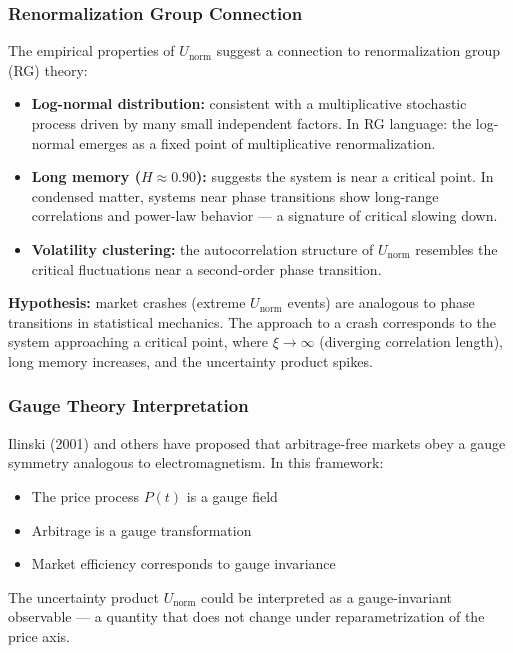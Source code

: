 \documentclass[11pt]{article}
\begin{document}
\subsubsection{Renormalization Group Connection}

The empirical properties of $U_\mathrm{norm}$ suggest a connection to renormalization group (RG) theory:

\begin{itemize}
    \item \textbf{Log-normal distribution:} consistent with a multiplicative stochastic process driven by many small independent factors. In RG language: the log-normal emerges as a fixed point of multiplicative renormalization.
    \item \textbf{Long memory ($H \approx 0.90$):} suggests the system is near a critical point. In condensed matter, systems near phase transitions show long-range correlations and power-law behavior --- a signature of critical slowing down.
    \item \textbf{Volatility clustering:} the autocorrelation structure of $U_\mathrm{norm}$ resembles the critical fluctuations near a second-order phase transition.
\end{itemize}

\textbf{Hypothesis:} market crashes (extreme $U_\mathrm{norm}$ events) are analogous to phase transitions in statistical mechanics. The approach to a crash corresponds to the system approaching a critical point, where $\xi \to \infty$ (diverging correlation length), long memory increases, and the uncertainty product spikes.

\subsubsection{Gauge Theory Interpretation}

Ilinski (2001) and others have proposed that arbitrage-free markets obey a gauge symmetry analogous to electromagnetism. In this framework:
\begin{itemize}
    \item The price process $P(t)$ is a gauge field
    \item Arbitrage is a gauge transformation
    \item Market efficiency corresponds to gauge invariance
\end{itemize}
The uncertainty product $U_\mathrm{norm}$ could be interpreted as a gauge-invariant observable --- a quantity that does not change under reparametrization of the price axis.
\end{document}
